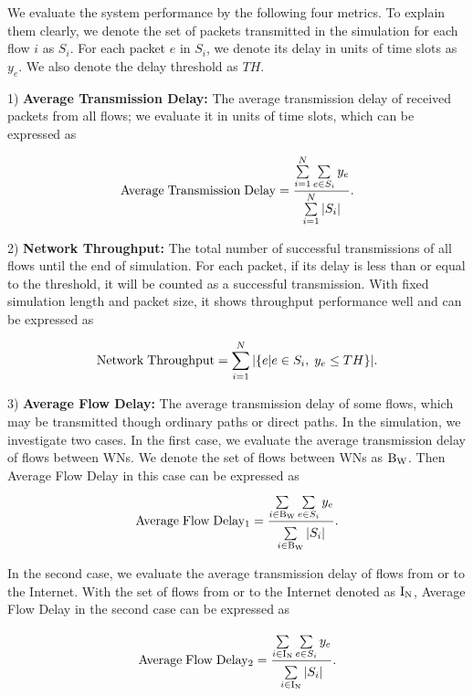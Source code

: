 \documentclass[journal]{IEEEtran}
\begin{document}
We evaluate the system performance by the following four metrics. To explain them clearly, we
denote the set of packets transmitted in the simulation for each flow $i$ as $S_i$. For each packet
$e$ in $S_i$, we denote its delay in units of time slots as $y_e$. We also denote the delay
threshold as $TH$.


1) \textbf{Average Transmission Delay:} The average transmission delay of received packets from all
flows; we evaluate it in units of time slots, which can be expressed as

\begin{equation}
{\rm{Average \;Transmission \;Delay}} = \frac{{\sum\limits_{i = 1}^N {\sum\limits_{e \in {S_i}}^{}
{{y_e}} } }}{{\sum\limits_{i = 1}^N {\left| {{S_i}} \right|} }}.
\end{equation}



2) \textbf{Network Throughput:} The total number of successful transmissions of all flows until the
end of simulation. For each packet, if its delay is less than or equal to the threshold, it will be
counted as a successful transmission. With fixed simulation length and packet size, it shows
throughput performance well and can be expressed as

\begin{equation}
{\rm{Network\; Throughput}} = \sum\limits_{i = 1}^N {\left| {\{ e|e \in {S_i},\;{y_e} \le TH\}}
\right|}.
\end{equation}



3) \textbf{Average Flow Delay:} The average transmission delay of some flows, which may be transmitted though ordinary paths or direct paths. In the simulation, we
investigate two cases. In the first case, we evaluate the average transmission delay of flows
between WNs. We denote the set of flows between WNs as ${\rm{B_W}}$. Then Average Flow Delay in
this case can be expressed as
\begin{equation}
{\rm{Average \;Flow \;Delay_1}} = \frac{{\sum\limits_{i \in {\rm{B_W}}}^{} {\sum\limits_{e \in
{S_i}}^{} {{y_e}} } }}{{\sum\limits_{i \in {\rm{B_W}}}^{} {\left| {{S_i}} \right|} }}.
\end{equation}


In the second case, we evaluate the average transmission delay of flows from or to the Internet.
With the set of flows from or to the Internet denoted as ${\rm{I_N}}$, Average Flow Delay in the
second case can be expressed as


\begin{equation}
{\rm{Average \;Flow \;Delay_2}} = \frac{{\sum\limits_{i \in {\rm{I_N}}}^{} {\sum\limits_{e \in
{S_i}}^{} {{y_e}} } }}{{\sum\limits_{i \in {\rm{I_N}}}^{} {\left| {{S_i}} \right|} }}.
\end{equation}
\end{document}
